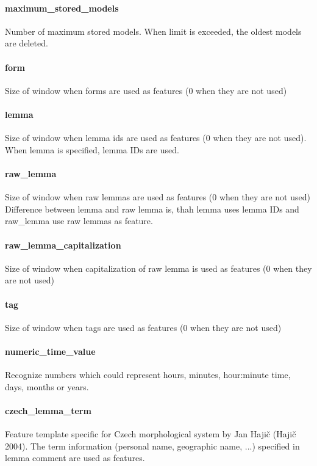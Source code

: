 \paragraph{maximum\_stored\_models}
Number of maximum stored models. When limit is exceeded, the oldest models are deleted.

\paragraph{form}
Size of window when forms are used as features (0 when they are not used)

\paragraph{lemma}
Size of window when lemma ids are used as features (0 when they are not used).
When lemma is specified, lemma IDs are used.

\paragraph{raw\_lemma}
Size of window when raw lemmas are used as features (0 when they are not used)
Difference between lemma and raw lemma is, thah lemma uses lemma IDs and raw\_lemma use raw lemmas as feature.

\paragraph{raw\_lemma\_capitalization}
Size of window when capitalization of raw lemma is used as features (0 when they are not used)

\paragraph{tag}
Size of window when tags are used as features (0 when they are not used)

\paragraph{numeric\_time\_value}
Recognize numbers which could represent hours, minutes, hour:minute time, days,
months or years.

\paragraph{czech\_lemma\_term}
Feature template specific for Czech morphological system by Jan Hajič (Hajič 2004).
The term information (personal name, geographic name, ...) specified in lemma comment
are used as features.


